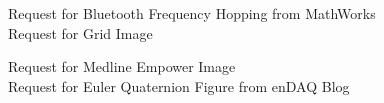 \begin{center}
\newline Request for Bluetooth Frequency Hopping from MathWorks\\
\vspace{1\baselineskip} %
\newline Request for Grid Image\\
\vspace{1\baselineskip} %

\newpage
{}
\newline Request for Medline Empower Image\\
\vspace{1\baselineskip} %
\newline Request for Euler Quaternion Figure from enDAQ Blog\\

\end{center}